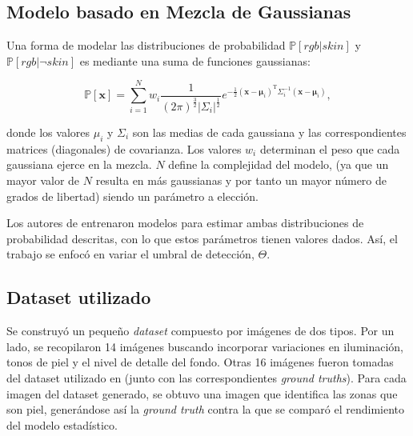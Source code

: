 \documentclass[12pt]{article}
\begin{document}
\subsection{Modelo basado en Mezcla de Gaussianas}

Una forma de modelar las distribuciones de probabilidad  $\mathbb{P} [ rgb|skin
]$ y $\mathbb{P} [ rgb | \neg skin ]$ es mediante una suma de funciones
gaussianas:

\begin{equation}
    \mathbb{P}[\mathbf{x}] = \sum\limits_{i=1}^N w_i
    \frac{1}{(2\pi)^{\frac{3}{2}} | \Sigma_i |^\frac{1}{2}} e^{-\frac{1}{2}
    (\mathbf{x} - \mathbf{\mu}_i)^{\text{T}} \Sigma_i ^{-1} (\mathbf{x} -
    \mathbf{\mu}_i)},
\end{equation} 

donde los valores $\mu_i$ y $\Sigma_i$ son las medias de cada gaussiana y las
correspondientes matrices (diagonales) de covarianza. Los valores $w_i$
determinan el peso que cada gaussiana ejerce en la mezcla. $N$ define la
complejidad del modelo, (ya que un mayor valor de $N$ resulta en más gaussianas
y por tanto un mayor número de grados de libertad) siendo un parámetro a
elección. 

Los autores de \cite{skin} entrenaron modelos para estimar ambas
distribuciones de probabilidad descritas, con lo que estos parámetros tienen
valores dados. Así, el trabajo se enfocó en variar el umbral de detección,
$\Theta$.

\subsection{Dataset utilizado}

Se construyó un pequeño \emph{dataset} compuesto por imágenes de dos tipos. Por
un lado, se recopilaron 14 imágenes buscando incorporar variaciones en
iluminación, tonos de piel y el nivel de detalle del fondo. Otras 16 imágenes
fueron tomadas del dataset utilizado en \cite{dataset} (junto con las
correspondientes \emph{ground truths}). Para cada imagen del
dataset generado, se obtuvo una imagen que identifica las zonas que son piel,
generándose así la \emph{ground truth} contra la que se comparó el rendimiento
del modelo estadístico.
\end{document}
